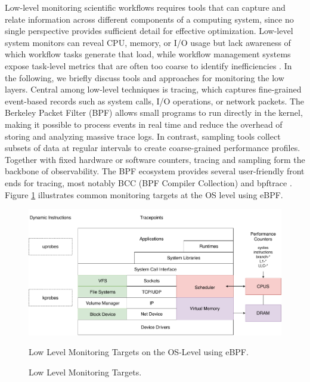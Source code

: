 Low-level monitoring scientific workflows requires tools that can capture and relate information across different components of a computing system, since no single perspective provides sufficient detail for effective optimization. Low-level system monitors can reveal CPU, memory, or I/O usage but lack awareness of which workflow tasks generate that load, while workflow management systems expose task-level metrics that are often too coarse to identify inefficiencies \cite{Witzke2024}. In the following, we briefly discuss tools and approaches for monitoring the low layers.
Central among low-level techniques is tracing, which captures fine-grained event-based records such as system calls, I/O operations, or network packets. The Berkeley Packet Filter (BPF) allows small programs to run directly in the kernel, making it possible to process events in real time and reduce the overhead of storing and analyzing massive trace logs. In contrast, sampling tools collect subsets of data at regular intervals to create coarse-grained performance profiles. Together with fixed hardware or software counters, tracing and sampling form the backbone of observability.
The BPF ecosystem provides several user-friendly front ends for tracing, most notably BCC (BPF Compiler Collection) and bpftrace \cite{gregg2020bpf}. Figure \ref{fig:02-ebpf-os} illustrates common monitoring targets at the OS level using eBPF.
\begin{figure}[H]
    \centering
    \includegraphics[scale=0.4]{fig/02/02-ebpf-os.pdf}
    \small
    \caption{Low Level Monitoring Targets.}
    \label{fig:02-ebpf-os}
    \tiny
    Low Level Monitoring Targets on the OS-Level using eBPF.
\end{figure}

